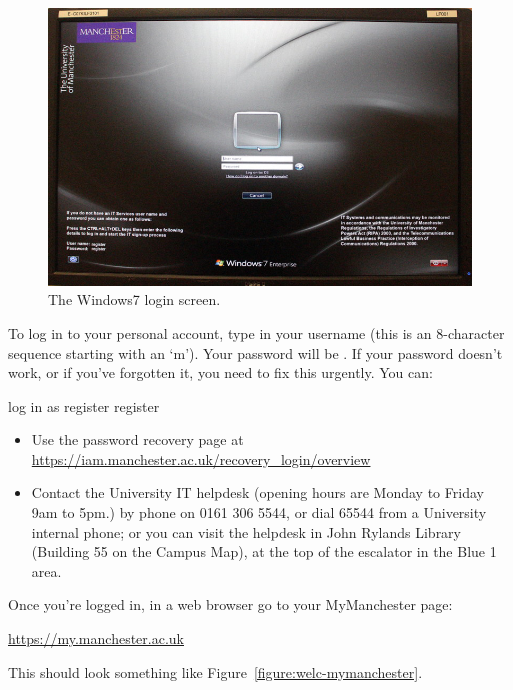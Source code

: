 \begin{figure}
\centerline{\includegraphics[width=15cm]{images/TH-win-login}}
\caption{The Windows7 login screen.}
\label{figure:login-screen}
\end{figure}

To log in to your personal account, type in your username (this is an
8-character sequence starting with an `m'). Your password will
be \splunge. If your password doesn't work, or if you've forgotten it,
you need to fix this urgently. You can:

\begin{note}
log in as register register
\end{note}

\begin{itemize}
\item Use the password recovery page at\\ \url{https://iam.manchester.ac.uk/recovery_login/overview}
\item Contact the University IT helpdesk (opening hours are Monday to Friday 9am to 5pm.) by phone on 0161 306 5544, or dial 65544 from a University internal phone; or you can visit the helpdesk in John Rylands Library (Building 55 on
the Campus Map), at the top of the escalator in the Blue 1 area.
\end{itemize}

Once you're logged in, in a web browser go to your MyManchester page:

\url{https://my.manchester.ac.uk}

This should look something like Figure~\ref{figure:welc-mymanchester}.

